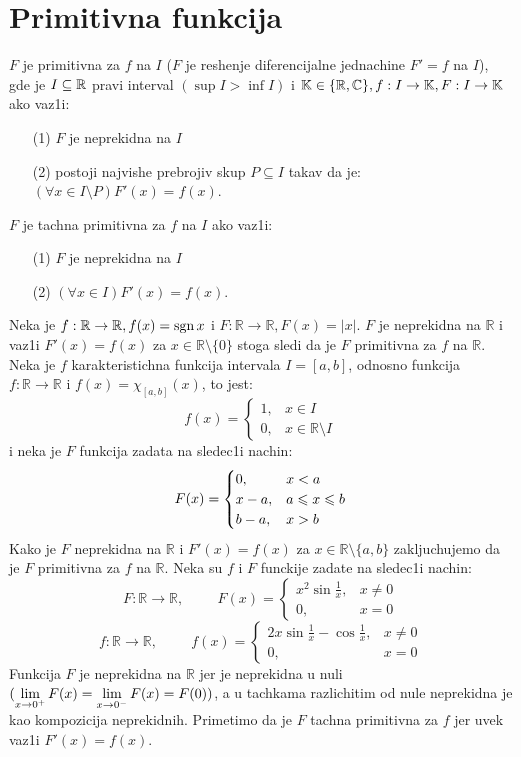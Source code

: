 \documentclass[../main.tex]{subfiles}
\begin{document}
\section{Primitivna funkcija}

{\de $F$ je primitivna za $f$ na $I$ ($F$ je reshenje diferencijalne jednachine $F'=f$ na $I$), gde je $I \subseteq \mathbb{R}$ pravi interval $(\sup I > \inf I)$ i $\mathbb{K} \in\{\mathbb{R}, \mathbb{C}\}, f:I\to \mathbb{K}, F:I\to \mathbb{K} $ ako vaz1i:
 \begin{itemize}
        \item[(1)] $F$ je neprekidna na $I$
        \item[(2)] postoji najvishe prebrojiv skup $P\subseteq I$ takav da je: $(\forall x \in I\setminus P) F'(x)=f(x)$.
\end{itemize} 
$F$ je tachna primitivna za $f$ na $I$ ako vaz1i:
\begin{itemize}
        \item[(1)] $F$ je neprekidna na $I$
        \item[(2)] $(\forall x \in I) F'(x)=f(x)$.
\end{itemize}
}
{\pr Neka je $f:\mathbb{R}\to \mathbb{R}, f(x)= \operatorname{sgn} x$ i $F:\mathbb{R}\to \mathbb{R}, F(x)= |x|$. $F$ je neprekidna na $\mathbb{R}$ i vaz1i $F'(x)=f(x)$ za $x \in \mathbb{R}\setminus \{0\}$ stoga sledi da je $F$ primitivna za $f$ na $\mathbb{R}$}.
{\pr Neka je $f$ karakteristichna funkcija intervala $I=[a,b]$, odnosno funkcija $f:\mathbb{R}\to \mathbb{R}$ i $f(x)=\chi_{[a,b]}(x)$, to jest: $$
f(x)=\begin{cases}
			1, & x\in I\\
            0, & x\in \mathbb{R}\setminus I
		 \end{cases}$$
i neka je $F$ funkcija zadata na sledec1i nachin:
$$F(x)=\begin{cases}
			0, & x<a\\
            x-a, & a\leqslant x \leqslant b\\
            b-a, & x>b
		 \end{cases}$$
Kako je $F$ neprekidna na $\mathbb{R}$ i $F'(x)=f(x)$ za $x\in\mathbb{R}\setminus\{a,b\}$ zakljuchujemo da je $F$ primitivna za $f$ na $\mathbb{R}$.}
{\pr Neka su $f$ i $F$ funckije zadate na sledec1i nachin:
$$F:\mathbb{R}\to \mathbb{R},\hspace{1cm} F(x)=\begin{cases}
			x^2 \sin \frac{1}{x}, & x\ne 0\\
            0, & x=0
		 \end{cases}$$
$$f:\mathbb{R}\to \mathbb{R},\hspace{1cm} f(x)=\begin{cases}
			2x \sin \frac{1}{x} - \cos \frac{1}{x}, & x\ne 0\\
            0, & x=0
		 \end{cases}$$
Funkcija $F$ je neprekidna na $\mathbb{R}$ jer je neprekidna u nuli $\displaystyle{(\lim_{x\to 0^{+}}F(x)=\lim_{x\to 0^{-}}F(x)}=F(0) )$, a u tachkama razlichitim od nule neprekidna je kao kompozicija neprekidnih. Primetimo da je $F$ tachna primitivna za $f$ jer uvek vaz1i $F'(x)=f(x)$}.
\end{document}
